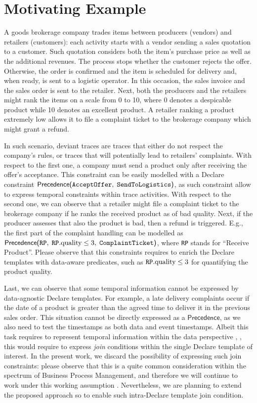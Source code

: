 \section{Motivating Example}\label{sec:mot}
A goods brokerage company \cite{PetermannJMR14} trades items between producers (vendors) and retailers (customers): each activity starts with a vendor sending a sales quotation to a customer. Such quotation considers both the item's purchase price as well as the additional revenues. The process stops whether the customer rejects the offer. Otherwise, the order is confirmed and the item is scheduled for delivery and, when ready, is sent to a logistic operator. In this occasion, the sales invoice and the sales order is sent to the retailer. Next, both the producers and the retailers might rank the items on a scale from 0 to 10, where 0 denotes a despicable product while 10 denotes an excellent product. A retailer ranking a product extremely low allows it to file a complaint ticket to the brokerage company which might grant a refund. 

In such scenario, deviant traces are traces that either do not respect the company's rules, or traces that will potentially lead to retailers' complaints. With respect to the first one, a company must send a product only after receiving the offer's acceptance. This constraint can be easily modelled with a Declare constraint $\Sdeclare{Precedence}{AcceptOffer}{SendToLogistics}$, as such constraint allow to express temporal constraints within trace activities. With respect to the second one, we can observe that a retailer might file a complaint ticket to the brokerage company if he ranks the received product as of bad quality. Next, if the producer assesses that also the product is bad, then a refund is triggered. E.g., the first part of the complaint handling can be modelled as $\Pfdeclare{Precedence}{RP}{ComplaintTicket}{\texttt{RP}.\textup{quality}\leq 3}$, where \texttt{RP} stands for ``Receive Product''. Please observe that this constraints requires to enrich the Declare templates with data-aware predicates, such as  $\texttt{RP}.\textup{quality}\leq 3$ for quantifying the product quality. 


Last, we can observe that some temporal information cannot be expressed by data-agnostic Declare templates. For example, a late delivery complaints occur if the date of a product is greater than the agreed time to deliver it in the previous sales order. This situation cannot be directly expressed as a $\textsf{Precedence}$, as we also need to test the timestamps as both data and event timestamps. Albeit this task requires to represent temporal information within the data perspective \cite{MultiPerspective}, , this would require to express \textit{join} conditions within the single Declare template of interest. In the present work, we discard the possibility of expressing such join constraints: please observe that this is a quite common consideration within the spectrum of Business Process Management, and therefore we will continue to work under this working assumption \cite{10.1007/978-3-642-40176-3_8}. Nevertheless, we are planning to extend the proposed approach so to enable such intra-Declare template join condition.